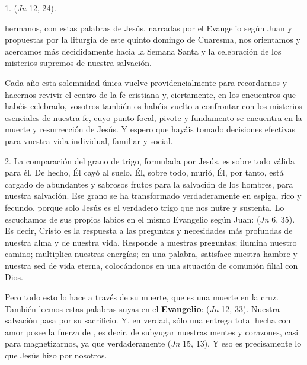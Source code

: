 
\begin{body}
1.  (\textit{Jn} 12, 24).

 hermanos, con estas palabras de Jesús, narradas por el Evangelio según Juan y propuestas por la liturgia de este quinto domingo de Cuaresma, nos orientamos y acercamos más decididamente hacia la Semana Santa y la celebración de los misterios supremos de nuestra salvación. 


Cada año esta solemnidad única vuelve providencialmente para recordarnos y hacernos revivir el centro de la fe cristiana y, ciertamente, en los encuentros que habéis celebrado, vosotros también os habéis vuelto a confrontar con los misterios esenciales de nuestra fe, cuyo punto focal, pivote y fundamento se encuentra en la muerte y resurrección de Jesús. Y espero que hayáis tomado decisiones efectivas para vuestra vida individual, familiar y social.

2. La comparación del grano de trigo, formulada por Jesús, es sobre todo válida para él. De hecho, Él cayó al suelo. Él, sobre todo, murió, Él, por tanto, está cargado de abundantes y sabrosos frutos para la salvación de los hombres, para nuestra salvación. Ese grano se ha transformado verdaderamente en espiga, rico y fecundo, porque solo Jesús es el verdadero trigo que nos nutre y sustenta. Lo escuchamos de sus propios labios en el mismo Evangelio según Juan:  (\textit{Jn} 6, 35). Es decir, Cristo es la respuesta a las preguntas y necesidades más profundas de nuestra alma y de nuestra vida. Responde a nuestras preguntas; ilumina nuestro camino; multiplica nuestras energías; en una palabra, satisface nuestra hambre y nuestra sed de vida eterna, colocándonos en una situación de comunión filial con Dios.

Pero todo esto lo hace a través de su muerte, que es una muerte en la cruz. También leemos estas palabras suyas en el \textbf{Evangelio}:  (\textit{Jn} 12, 33). Nuestra salvación pasa por su sacrificio. Y, en verdad, sólo una entrega total hecha con amor posee la fuerza de , es decir, de subyugar nuestras mentes y corazones, casi para magnetizarnos, ya que verdaderamente  (\textit{Jn} 15, 13). Y eso es precisamente lo que Jesús hizo por nosotros.


\end{body}
